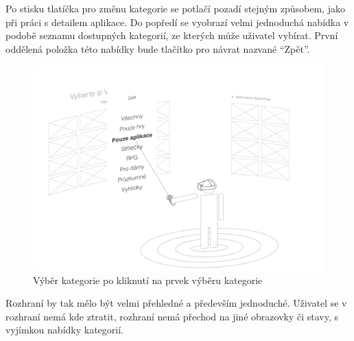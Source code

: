 Po stisku tlatíčka pro změnu kategorie se potlačí pozadí stejným
způsobem, jako při práci s detailem aplikace. Do popředí se vyobrazí
velmi jednoduchá nabídka v podobě seznamu dostupných kategorií, ze
kterých může uživatel vybírat. První oddělená položka této nabídky bude
tlačítko pro návrat nazvané ``Zpět''.

\begin{figure}[h!]
\centering
\includegraphics[width=\textwidth]{src/assets/wireframe-sorting.pdf}
\caption{Výběr kategorie po kliknutí na prvek výběru kategorie}
\end{figure}

Rozhraní by tak mělo být velmi přehledné a především jednoduché.
Uživatel se v rozhraní nemá kde ztratit, rozhraní nemá přechod na jiné
obrazovky či stavy, s vyjímkou nabídky kategorií.
